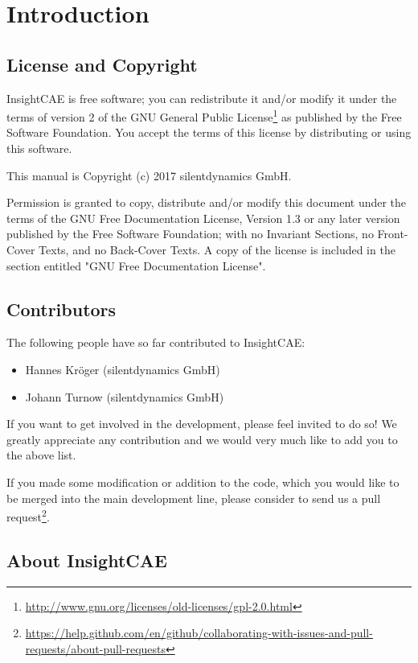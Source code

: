 
\section{Introduction}

\subsection{License and Copyright}

InsightCAE is free software; you can redistribute it and/or modify it under the terms of version 2 of the GNU General Public License\footnote{\url{http://www.gnu.org/licenses/old-licenses/gpl-2.0.html}} as published by the Free Software Foundation. You accept the terms of this license by distributing or using this software.

This manual is Copyright (c) 2017 silentdynamics GmbH.

Permission is granted to copy, distribute and/or modify this document under the terms of the GNU Free Documentation License, Version 1.3 or any later version published by the Free Software Foundation; with no Invariant Sections, no Front-Cover Texts, and no Back-Cover Texts. A copy of the license is included in the section entitled "GNU Free Documentation License".

\subsection{Contributors}

The following people have so far contributed to InsightCAE:
\begin{itemize}
\item Hannes Kröger (silentdynamics GmbH)
\item Johann Turnow (silentdynamics GmbH)
\end{itemize}

If you want to get involved in the development, please feel invited to do so!
We greatly appreciate any contribution and we would very much like to add you to the above list.

If you made some modification or addition to the code, which you would like to be merged into the main development line, please consider to send us a pull request\footnote{\url{https://help.github.com/en/github/collaborating-with-issues-and-pull-requests/about-pull-requests}}.

\subsection{About InsightCAE}

